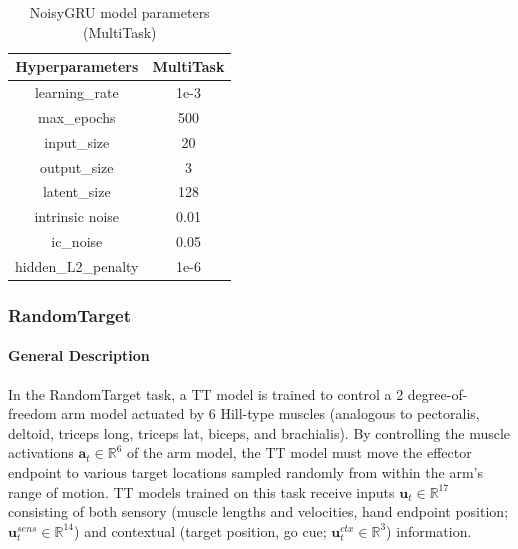 \documentclass{article}
\begin{document}
\begin{table}[ht]
\centering
\begin{tabular}{|c|c|}
\hline
\textbf{Hyperparameters} & \textbf{MultiTask} \\ \hline
learning\_rate &  1e-3  \\ \hline
max\_epochs &  500  \\ \hline
input\_size & 20 \\ \hline
output\_size & 3 \\ \hline
latent\_size & 128 \\ \hline
intrinsic noise &  0.01 \\ \hline
ic\_noise & 0.05  \\ \hline
hidden\_L2\_penalty & 1e-6 \\ \hline
\end{tabular}
\caption{NoisyGRU model parameters (MultiTask)}
\label{table:MultiTaskGRU}
\end{table}

\clearpage
\subsubsection{RandomTarget \label{appendix:TaskDescription-RandomTarget}}
\paragraph{General Description}
In the RandomTarget task, a TT model is trained to control a 2 degree-of-freedom arm model actuated by 6 Hill-type muscles (analogous to pectoralis, deltoid, triceps long, triceps lat, biceps, and brachialis). By controlling the muscle activations $\mathbf{a}_t \in \mathbb{R}^6$ of the arm model, the TT model must move the effector endpoint to various target locations sampled randomly from within the arm's range of motion. TT models trained on this task receive inputs $\mathbf{u}_t \in \mathbb{R}^{17}$ consisting of both sensory (muscle lengths and velocities, hand endpoint position; $\mathbf{u}_t^{sens} \in \mathbb{R}^{14}$) and contextual (target position, go cue; $\mathbf{u}_t^{ctx} \in \mathbb{R}^{3}$) information.
\end{document}
